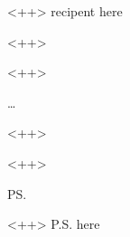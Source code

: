 \documentclass[letterpaper, 11pt, notitlepage]{letter}
\begin{document}
\begin{letter}{<++> recipent here}

\opening{<++>}

<++>

\ldots

<++>

\closing{<++>}

\ps

<++> P.S. here

\end{letter}
\end{document}
